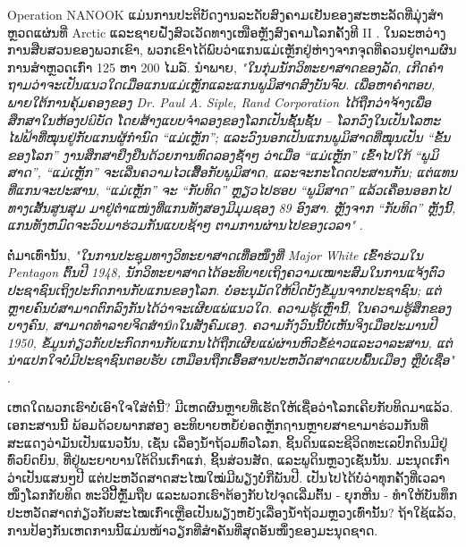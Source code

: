 \documentclass[10pt,twocolumn,letterpaper]{article}
\begin{document}
Operation NANOOK ແມ່ນການປະຕິບັດງານລະດັບສົງຄາມເຢັນຂອງສະຫະລັດທີ່ມຸ່ງສໍາຫຼວດແຜ່ນທີ່ Arctic ແລະຊາຍຝັ່ງສົວເວັດທາງເໜືອຫຼັງສົງຄາມໂລກຄັ້ງທີ II \cite{137}. ໃນລະຫວ່າງການສືບສວນຂອງພວກເຂົາ, ພວກເຂົາໄດ້ພົບວ່າແກນແມ່ເຫຼັກຢູ່ຫ່າງຈາກຈຸດທີ່ຄວນຢູ່ຕາມຜົນການສຳຫຼວດເກົ່າ 125 ຫາ 200 ໄມລ໌. ນຳພາຍ, \textit{"ໃນກຸ່ມນັກວິທະຍາສາດຂອງລັດ, ເກີດຄໍາຖາມວ່າຈະເປັນແນວໃດເມື່ອແກນແມ່ເຫຼັກແລະແກນພູມິສາດສົງບັນຈົບ. ເພື່ອຫາຄໍາຕອບ, ພາຍໃຕ້ການຄຸ້ມຄອງຂອງ Dr. Paul A. Siple, Rand Corporation ໄດ້ຖືກວ່າຈ້າງເພື່ອສຶກສາໃນຫ້ອງປຏິບັດ ໂດຍສ້າງແບບຈຳລອງຂອງໂລກເປັນຊັ້ນຊັ້ນ – ໂລກວົງໃນເປັນໂລຫະໄຟຟ້າທີ່ໝຸນຢູ່ກັບແກນຜູ້ກຳນົດ “ແມ່ເຫຼັກ”; ແລະວົງນອກເປັນແກນພູມິສາດທີ່ໝຸນເປັນ “ຂັ້ນຂອງໂລກ” ງານສຶກສາຢຶງຢືນດ້ວຍການທົດລອງຊໍ້າໆ ວ່າເມື່ອ “ແມ່ເຫຼັກ” ເຂົ້າໄປໃກ້ “ພູມິສາດ”, “ແມ່ເຫຼັກ” ຈະເລີ່ນຄວາມໄວເສື້ອກັບພູມິສາດ, ແລະຈະກະໂດດປະສານກັນ; ແຕ່ແທນທີ່ແກນຈະປະສານ, “ແມ່ເຫຼັກ” ຈະ “ກັບທິດ” ຫຼຽວໄປຮອບ “ພູມິສາດ” ແລ້ວເຄື່ອນອອກໄປທາງເສັ້ນສູນສຸມ ມາຢູ່ຕໍາແໜ່ງທີ່ແກນທັງສອງມີມຸມຊອງ 89 ອົງສາ. ຫຼັງຈາກ “ກັບທິດ” ຫຼັງນີ້, ແກນທັງຫມົດຈະວົບມາຮ່ວມກັນແບບຊ້າໆ ຕາມການຜ່ານໄປຂອງເວລາ"} \cite{138,139}.

ຕໍ່ມາເທົ່ານັ້ນ, \textit{"ໃນການປະຊຸມທາງວິທະຍາສາດເທື່ອໜຶ່ງທີ່ Major White ເຂົ້າຮ່ວມໃນ Pentagon ຕົ້ນປີ 1948, ນັກວິທະຍາສາດໄດ້ອະທິບາຍເຖິງຄວາມເໝາະສົມໃນການແຈ້ງຕົວປະຊາຊົນເຖິງປະກົດການກັບແກນຂອງໂລກ. ບໍ່ອະນຸມັດໃຫ້ປິດບັງຂໍ້ມູນຈາກປະຊາຊົນ; ແຕ່ຫຼາຍຄົນບໍ່ສາມາດຕົກລົງກັນໄດ້ວ່າຈະເຜີຍແພ່ແນວໃດ. ຄວາມຮູ້ເຫຼົ່ານີ້, ໃນຄວາມຮູ້ສຶກຂອງບາງຄົນ, ສາມາດທຳລາຍຈິດສຳນึกໃນສັງຄົມເອງ. ຄວາມກັງວົນນີ້ບໍ່ເຫັນຈິງເມື່ອປະມານປີ 1950, ຂໍ້ມູນກ່ຽວກັບປະກົດການກັບແກນໄດ້ຖືກເຜີຍແພ່ຜ່ານຫົວຂໍ້ຂ່າວແລະວາລະສານ, ແຕ່ນ່າແປກໃຈບໍ່ມີປະຊາຊົນຕອບຮັບ ເຫມືອນຖືກເອື້ອສານປະຫວັດສາດແບບພື້ນເມືອງ ຫຼືບໍ່ເຊື່ອ"} \cite{138,139}.

ເຫດໃດພວກເຮົາບໍ່ເອົາໃຈໃສ່ຕໍ່ນີ້? ມີເຫດຜົນຫຼາຍທີ່ເຮັດໃຫ້ເຊື່ອວ່າໂລກເຄີຍກັບທິດມາແລ້ວ. ເອກະສານນີ້ ພ້ອມດ້ວຍພາກສອງ ອະທິບາຍຫຍໍ້ຍ່ອດຫຼັກຐານຫຼາຍສາຂາມາຮ່ວມກັນທີ່ສະແດງວ່າມັນເປັນແນວນັ້ນ, ເຊັ່ນ ເລື່ອງນ້ຳຖ້ວມທົ່ວໂລກ, ຊິ້ນດິນແລະຊີວິດທະເລປົກດິນມີຢູ່ທົ່ວບົດບົນ, ທີ່ຢູ່ພະຍາບານໃຕ້ດິນເກົ່າແກ່, ຊິ້ນສ່ວນສັດ, ແລະພູດິນຫຼວງເຊັ່ນນັ້ນ. ມະນຸດເກົ່າວ່າເປັນແສນໆປີ ແຕ່ປະຫວັດສາດສະໄໝໃໝ່ມີພຽງບໍ່ກີ່ພັນປີ. ເປັນໄປໄດ້ບໍ່ວ່າທຸກຄັ້ງທີ່ເວລາໜຶ່ງໂລກກັບທິດ ທະວີປີ້ຫຼົ້ມຖືບ ແລະພວກເຮົາຕ້ອງກັບໄປຈຸດເລີ່ມຕົ້ນ - ຍຸກຫີນ - ທຳໃຫ້ບັນທຶກປະຫວັດສາດກ່ຽວກັບສະໄໝເກົ່າເຫຼືອເປັນພຽງຫຍັງເລື່ອງນ້ຳຖ້ວມຫຼວງເທົ່ານັ້ນ? ຖ້າໃຊ້ແລ້ວ, ການປ້ອງກັນເຫດການນີ້ແມ່ນໜ້າວຽກທີ່ສຳຄັນທີ່ສຸດອັນໜຶ່ງຂອງມະນຸດຊາດ.
\end{document}
